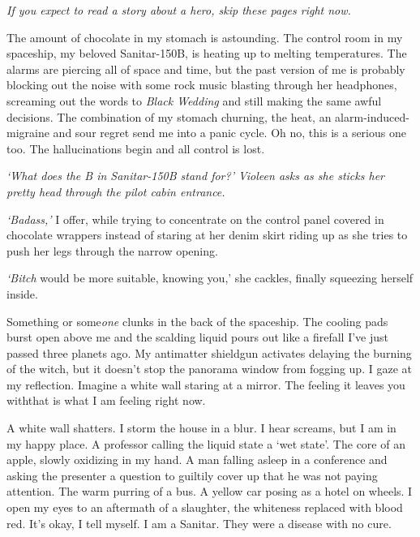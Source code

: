 ﻿\newenvironment{flashback}{\em}{}
\newcommand{\varending}[2]{\textbf{Ending #1.} #2}

\textit{If you expect to read a story about a hero, skip these pages
right now.}

The amount of chocolate in my stomach is astounding. The control room
in my spaceship, my beloved Sanitar-150B, is heating up to melting
temperatures. The alarms are piercing all of space and time, but the
past version of me is probably blocking out the noise with some rock
music blasting through her headphones, screaming out the words to
\textit{Black Wedding} and still making the same awful decisions. The
combination of my stomach churning, the heat, an
alarm-induced-migraine and sour regret send me into a panic cycle. Oh
no, this is a serious one too. The hallucinations begin and all
control is lost.

\hsep

\begin{flashback}
`What does the B in Sanitar-150B stand for?' Violeen asks
as she sticks her pretty head through the pilot cabin entrance.

\emph{`Badass,'} I offer, while trying to concentrate on the control
panel covered in chocolate wrappers instead of staring at her denim
skirt riding up as she tries to push her legs through the narrow
opening.

\emph{`Bitch} would be more suitable, knowing you,' she cackles,
finally squeezing herself inside.

Something or some\emph{one} clunks in the back of the spaceship. The
cooling pads burst open above me and the scalding liquid pours out
like a firefall I've just passed three planets ago. My antimatter
shieldgun activates delaying the burning of the witch, but it doesn't
stop the panorama window from fogging up. I gaze at my
reflection. Imagine a white wall staring at a mirror. The feeling it
leaves you with\textemdash that is what I am feeling right now.

A white wall shatters. I storm the house in a blur. I hear screams,
but I am in my happy place. A professor calling the liquid state a
`wet state'. The core of an apple, slowly oxidizing in my hand. A man
falling asleep in a conference and asking the presenter a question to
guiltily cover up that he was not paying attention. The warm purring
of a bus. A yellow car posing as a hotel on wheels. I open my eyes to
an aftermath of a slaughter, the whiteness replaced with blood
red. It's okay, I tell myself. I am a Sanitar. They were a disease
with no cure.
\end{flashback}

